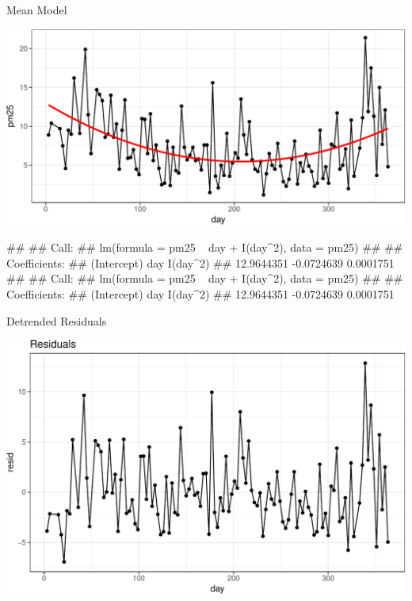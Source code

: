 \documentclass[11pt,ignorenonframetext,]{beamer}
\let\oldverbatim\verbatim
\let\endoldverbatim\endverbatim
\renewenvironment{verbatim}{\footnotesize\begin{spacing}{0.9}\oldverbatim}{\endoldverbatim\end{spacing}}
\begin{document}
\begin{frame}[fragile]{%
\protect\hypertarget{mean-model}{%
Mean Model}}

\begin{center}\includegraphics[width=\textwidth]{Lec13_files/figure-beamer/unnamed-chunk-11-1} \end{center}

\begin{verbatim}
## 
## Call:
## lm(formula = pm25 ~ day + I(day^2), data = pm25)
## 
## Coefficients:
## (Intercept)          day     I(day^2)  
##  12.9644351   -0.0724639    0.0001751
## 
## Call:
## lm(formula = pm25 ~ day + I(day^2), data = pm25)
## 
## Coefficients:
## (Intercept)          day     I(day^2)  
##  12.9644351   -0.0724639    0.0001751
\end{verbatim}

\end{frame}

\begin{frame}{%
\protect\hypertarget{detrended-residuals}{%
Detrended Residuals}}

\begin{center}\includegraphics[width=\textwidth]{Lec13_files/figure-beamer/unnamed-chunk-12-1} \end{center}

\end{frame}
\end{document}
